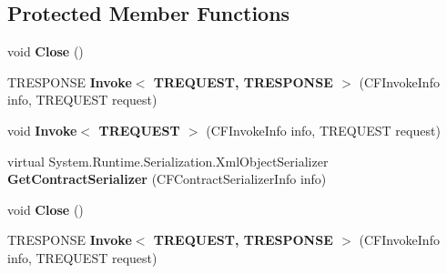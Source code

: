 \subsection*{Protected Member Functions}
\begin{DoxyCompactItemize}
\item 
\hypertarget{class_microsoft_1_1_tools_1_1_service_model_1_1_c_f_client_base_3_01_t_channel_01_4_a4709b1e8089055ddea64c558f10bf8c8}{
void {\bfseries Close} ()}
\label{class_microsoft_1_1_tools_1_1_service_model_1_1_c_f_client_base_3_01_t_channel_01_4_a4709b1e8089055ddea64c558f10bf8c8}

\item 
\hypertarget{class_microsoft_1_1_tools_1_1_service_model_1_1_c_f_client_base_3_01_t_channel_01_4_ab465a8ef81b300a869bd324739e7c39c}{
TRESPONSE {\bfseries Invoke$<$ TREQUEST, TRESPONSE $>$} (CFInvokeInfo info, TREQUEST request)}
\label{class_microsoft_1_1_tools_1_1_service_model_1_1_c_f_client_base_3_01_t_channel_01_4_ab465a8ef81b300a869bd324739e7c39c}

\item 
\hypertarget{class_microsoft_1_1_tools_1_1_service_model_1_1_c_f_client_base_3_01_t_channel_01_4_a20c0ff7e581bbec6c0c10ae1cd2f37bb}{
void {\bfseries Invoke$<$ TREQUEST $>$} (CFInvokeInfo info, TREQUEST request)}
\label{class_microsoft_1_1_tools_1_1_service_model_1_1_c_f_client_base_3_01_t_channel_01_4_a20c0ff7e581bbec6c0c10ae1cd2f37bb}

\item 
\hypertarget{class_microsoft_1_1_tools_1_1_service_model_1_1_c_f_client_base_3_01_t_channel_01_4_a17e696bc478b5b0105e44acd988ecaf8}{
virtual System.Runtime.Serialization.XmlObjectSerializer {\bfseries GetContractSerializer} (CFContractSerializerInfo info)}
\label{class_microsoft_1_1_tools_1_1_service_model_1_1_c_f_client_base_3_01_t_channel_01_4_a17e696bc478b5b0105e44acd988ecaf8}

\item 
\hypertarget{class_microsoft_1_1_tools_1_1_service_model_1_1_c_f_client_base_3_01_t_channel_01_4_a4709b1e8089055ddea64c558f10bf8c8}{
void {\bfseries Close} ()}
\label{class_microsoft_1_1_tools_1_1_service_model_1_1_c_f_client_base_3_01_t_channel_01_4_a4709b1e8089055ddea64c558f10bf8c8}

\item 
\hypertarget{class_microsoft_1_1_tools_1_1_service_model_1_1_c_f_client_base_3_01_t_channel_01_4_ab465a8ef81b300a869bd324739e7c39c}{
TRESPONSE {\bfseries Invoke$<$ TREQUEST, TRESPONSE $>$} (CFInvokeInfo info, TREQUEST request)}
\label{class_microsoft_1_1_tools_1_1_service_model_1_1_c_f_client_base_3_01_t_channel_01_4_ab465a8ef81b300a869bd324739e7c39c}


\end{DoxyCompactItemize}

